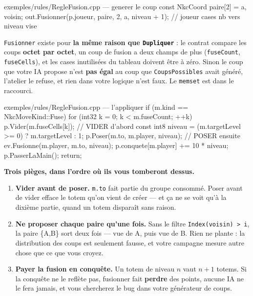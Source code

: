 \begin{nkcode}{exemples/rules/RegleFusion.cpp --- generer le coup}
const NkcCoord paire[2] = {a, voisin};
out.Fusionner(p.joueur, paire, 2, a, niveau + 1);
//            joueur    cases  nb  vers  niveau vise
\end{nkcode}

\texttt{Fusionner} existe pour \textbf{la même raison que \texttt{Dupliquer}} :
le contrat compare les coups \textbf{octet par octet}, un coup de fusion a deux
champs de plus (\texttt{fuseCount}, \texttt{fuseCells}), et les cases
inutilisées du tableau doivent être à zéro. Sinon le coup que votre IA propose
n'est \textbf{pas égal} au coup que \texttt{CoupsPossibles} avait généré,
l'atelier le refuse, et rien dans votre logique n'est faux. Le \texttt{memset}
est dans le raccourci.

\begin{nkcode}{exemples/rules/RegleFusion.cpp --- l'appliquer}
if (m.kind == NkcMoveKind::Fuse) {
    for (int32 k = 0; k < m.fuseCount; ++k) p.Vider(m.fuseCells[k]);  // VIDER d'abord
    const int8 niveau = (m.targetLevel >= 0) ? m.targetLevel : 1;
    p.Poser(m.to, m.player, niveau);                                  // POSER ensuite
    ev.Fusionne(m.player, m.to, niveau);
    p.conquete[m.player] += 10 * niveau;
    p.PasserLaMain();
    return;
}
\end{nkcode}

\textbf{Trois pièges, dans l'ordre où ils vous tomberont dessus.}

\begin{enumerate}
  \item \textbf{Vider avant de poser.} \texttt{m.to} fait partie du groupe
        consommé. Poser avant de vider efface le totem qu'on vient de créer ---
        et ça ne se voit qu'à la dixième partie, quand un totem disparaît sans
        raison.
  \item \textbf{Ne proposer chaque paire qu'une fois.} Sans le filtre
        \texttt{Index(voisin) > i}, la paire \{A,B\} sort deux fois --- vue de
        A, puis vue de B. Rien ne plante : la distribution des coups est
        seulement fausse, et votre campagne mesure autre chose que ce que vous
        croyez.
  \item \textbf{Payer la fusion en conquête.} Un totem de niveau $n$ vaut $n+1$
        totems. Si la conquête ne le reflète pas, fusionner fait \textbf{perdre}
        des points, aucune IA ne le fera jamais, et vous chercherez le bug dans
        votre générateur de coups.
\end{enumerate}

